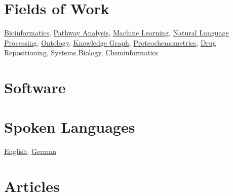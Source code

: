 \documentclass[11pt,a4paper,sans]{moderncv} %
\begin{document}
\section{Fields of Work}\label{sec:fields}

    \href{https://bioregistry.io/wikidata:Q128570}{Bioinformatics},     \href{https://bioregistry.io/wikidata:Q25303877}{Pathway Analysis},     \href{https://bioregistry.io/wikidata:Q2539}{Machine Learning},     \href{https://bioregistry.io/wikidata:Q30642}{Natural Language Processing},     \href{https://bioregistry.io/wikidata:Q324254}{Ontology},     \href{https://bioregistry.io/wikidata:Q33002955}{Knowledge Graph},     \href{https://bioregistry.io/wikidata:Q50327360}{Proteochemometrics},     \href{https://bioregistry.io/wikidata:Q5308921}{Drug Repositioning},     \href{https://bioregistry.io/wikidata:Q815297}{Systems Biology},     \href{https://bioregistry.io/wikidata:Q910164}{Cheminformatics}
    \section{Software}\label{sec:software}

    \section{Spoken Languages}\label{sec:languages}

        \href{https://bioregistry.io/wikidata:Q1860}{English},
        \href{https://bioregistry.io/wikidata:Q188}{German}
\section{Articles}\label{articles}
\end{document}
